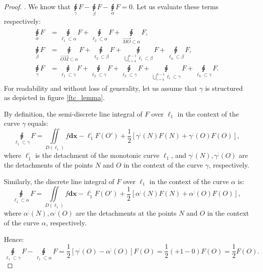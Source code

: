 \documentclass[11pt]{book}
\begin{document}
\begin{proof}. We know that $\underset{\gamma}{\sqint}F-\underset{\beta}{\sqint}F-\underset{\alpha}{\sqint}F=0.$
Let us evaluate these terms respectively:
\begin{align}\label{ftc_lemma_equations}
\begin{aligned}
\underset{\alpha}{\sqint}F & =\underset{\ell_{1}\subset\alpha}{\sqint}F+\underset{\ell_{2}\subset\alpha}{\sqint}F+\underset{\overrightarrow{MO}\subset\alpha}{\sqint}F,\\
\underset{\beta}{\sqint}F & =\underset{\overrightarrow{OM}\subset\alpha}{\sqint}F+\underset{\ell_{3}\subset\beta}{\sqint}F+\underset{\bigcup_{i=4}^{n-1}\ell_{i}\subset\beta}{\sqint}F+\underset{\ell_{n}\subset\beta}{\sqint}F,\\
\underset{\gamma}{\sqint}F & =\underset{\ell_{1}\subset\gamma}{\sqint}F+\underset{\ell_{2}\subset\gamma}{\sqint}F+\underset{\ell_{3}\subset\gamma}{\sqint}F+\underset{\bigcup_{i=4}^{n-1}\ell_{i}\subset\gamma}{\sqint}F+\underset{\ell_{n}\subset\gamma}{\sqint}F.
\end{aligned}
\end{align}
For readability and without loss of generality, let us assume that
$\gamma$ is structured as depicted in figure \ref{ftc_lemma}.

By definition, the semi-discrete line integral of $F$ over $\ell_{1}$
in the context of the curve $\gamma$ equals:
\[
\underset{\ell_{1}\subset\gamma}{\sqint}F=\underset{D\left(\ell_{1}\right)}{\iint}f\boldsymbol{dx}-\ell_{1}^{;}F\left(O'\right)+\frac{1}{2}\left[\gamma^{;}\left(N\right)F\left(N\right)+\gamma^{;}\left(O\right)F\left(O\right)\right],
\]
where $\ell_{1}^{;}$ is the detachment of the monotonic curve $\ell_{1}$,
and $\gamma^{;}\left(N\right),\gamma^{;}\left(O\right)$ are the detachments
of the points $N$ and $O$ in the context of the curve $\gamma$,
respectively.

Similarly, the discrete line integral of $F$ over $\ell_{1}$ in
the context of the curve $\alpha$ is:
\[
\underset{\ell_{1}\subset\alpha}{\sqint}F=\underset{D\left(\ell_{1}\right)}{\iint}f\boldsymbol{dx}-\ell_{1}^{;}F\left(O'\right)+\frac{1}{2}\left[\alpha^{;}\left(N\right)F\left(N\right)+\alpha^{;}\left(O\right)F\left(O\right)\right],
\]
where $\alpha^{;}\left(N\right),\alpha^{;}\left(O\right)$ are the
detachments at the points $N$ and $O$ in the context of the curve
$\alpha$, respectively.

Hence:
\[
\underset{\ell_{1}\subset\gamma}{\sqint}F-\underset{\ell_{1}\subset\alpha}{\sqint}F=\frac{1}{2}\left[\gamma^{;}\left(O\right)-\alpha^{;}\left(O\right)\right]F\left(O\right)=\frac{1}{2}\left(+1-0\right)F\left(O\right)=\frac{1}{2}F\left(O\right).
\]


\end{proof}
\end{document}
